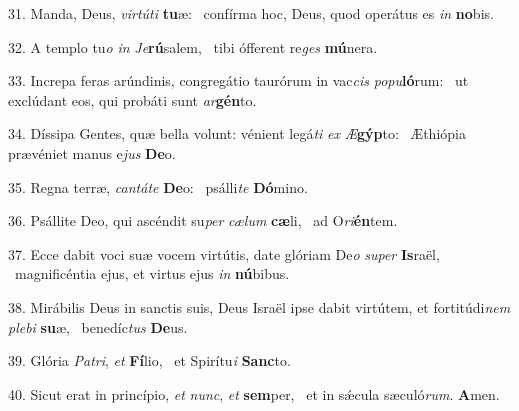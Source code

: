 31. Manda, Deus, \textit{vir}\textit{tú}\textit{ti} \textbf{tu}æ: \ast\  confírma hoc, Deus, quod operátus es \textit{in} \textbf{no}bis.\

32. A templo tu\textit{o} \textit{in} \textit{Je}\textbf{rú}salem, \ast\  tibi ófferent re\textit{ges} \textbf{mú}nera.\

33. Increpa feras arúndinis, congregátio taurórum in vac\textit{cis} \textit{po}\textit{pu}\textbf{ló}rum: \ast\  ut exclúdant eos, qui probáti sunt \textit{ar}\textbf{gén}to.\

34. Díssipa Gentes, quæ bella volunt: vénient legá\textit{ti} \textit{ex} \textit{Æ}\textbf{gýp}to: \ast\  Æthiópia prævéniet manus e\textit{jus} \textbf{De}o.\

35. Regna terræ, \textit{can}\textit{tá}\textit{te} \textbf{De}o: \ast\  psálli\textit{te} \textbf{Dó}mino.\

36. Psállite Deo, qui ascéndit su\textit{per} \textit{cæ}\textit{lum} \textbf{cæ}li, \ast\  ad O\textit{ri}\textbf{én}tem.\

37. Ecce dabit voci suæ vocem virtútis, date glóriam De\textit{o} \textit{su}\textit{per} \textbf{Is}raël, \ast\  magnificéntia ejus, et virtus ejus \textit{in} \textbf{nú}bibus.\

38. Mirábilis Deus in sanctis suis, Deus Israël ipse dabit virtútem, et fortitúdi\textit{nem} \textit{ple}\textit{bi} \textbf{su}æ, \ast\  benedíc\textit{tus} \textbf{De}us.\

39. Glória \textit{Pa}\textit{tri}, \textit{et} \textbf{Fí}lio, \ast\  et Spirítu\textit{i} \textbf{Sanc}to.\

40. Sicut erat in princípio, \textit{et} \textit{nunc}, \textit{et} \textbf{sem}per, \ast\  et in sǽcula sæculó\textit{rum}. \textbf{A}men.\


